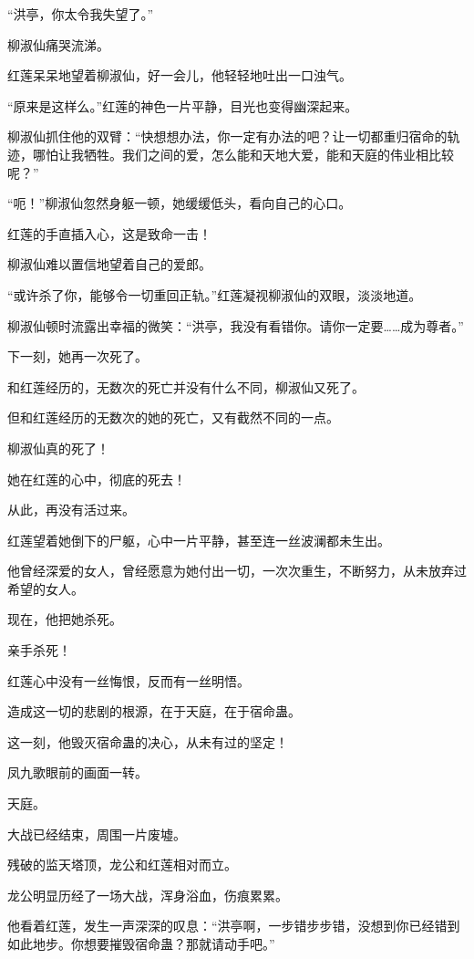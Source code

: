 \begin{this_body}
“洪亭，你太令我失望了。”

柳淑仙痛哭流涕。

红莲呆呆地望着柳淑仙，好一会儿，他轻轻地吐出一口浊气。

“原来是这样么。”红莲的神色一片平静，目光也变得幽深起来。

柳淑仙抓住他的双臂：“快想想办法，你一定有办法的吧？让一切都重归宿命的轨迹，哪怕让我牺牲。我们之间的爱，怎么能和天地大爱，能和天庭的伟业相比较呢？”

“呃！”柳淑仙忽然身躯一顿，她缓缓低头，看向自己的心口。

红莲的手直插入心，这是致命一击！

柳淑仙难以置信地望着自己的爱郎。

“或许杀了你，能够令一切重回正轨。”红莲凝视柳淑仙的双眼，淡淡地道。

柳淑仙顿时流露出幸福的微笑：“洪亭，我没有看错你。请你一定要……成为尊者。”

下一刻，她再一次死了。

和红莲经历的，无数次的死亡并没有什么不同，柳淑仙又死了。

但和红莲经历的无数次的她的死亡，又有截然不同的一点。

柳淑仙真的死了！

她在红莲的心中，彻底的死去！

从此，再没有活过来。

红莲望着她倒下的尸躯，心中一片平静，甚至连一丝波澜都未生出。

他曾经深爱的女人，曾经愿意为她付出一切，一次次重生，不断努力，从未放弃过希望的女人。

现在，他把她杀死。

亲手杀死！

红莲心中没有一丝悔恨，反而有一丝明悟。

造成这一切的悲剧的根源，在于天庭，在于宿命蛊。

这一刻，他毁灭宿命蛊的决心，从未有过的坚定！

凤九歌眼前的画面一转。

天庭。

大战已经结束，周围一片废墟。

残破的监天塔顶，龙公和红莲相对而立。

龙公明显历经了一场大战，浑身浴血，伤痕累累。

他看着红莲，发生一声深深的叹息：“洪亭啊，一步错步步错，没想到你已经错到如此地步。你想要摧毁宿命蛊？那就请动手吧。”


\end{this_body}
